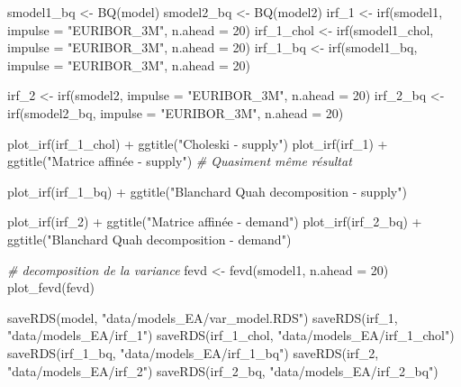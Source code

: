 \documentclass[
  10pt,
]{article}
\newenvironment{Shaded}{\begin{snugshade}}{\end{snugshade}}
\newcommand{\AttributeTok}[1]{\textcolor[rgb]{0.77,0.63,0.00}{#1}}
\newcommand{\CommentTok}[1]{\textcolor[rgb]{0.56,0.35,0.01}{\textit{#1}}}
\newcommand{\DecValTok}[1]{\textcolor[rgb]{0.00,0.00,0.81}{#1}}
\newcommand{\FunctionTok}[1]{\textcolor[rgb]{0.00,0.00,0.00}{#1}}
\newcommand{\NormalTok}[1]{#1}
\newcommand{\OtherTok}[1]{\textcolor[rgb]{0.56,0.35,0.01}{#1}}
\newcommand{\SpecialCharTok}[1]{\textcolor[rgb]{0.00,0.00,0.00}{#1}}
\newcommand{\StringTok}[1]{\textcolor[rgb]{0.31,0.60,0.02}{#1}}
\begin{document}
\begin{Shaded}
\begin{Highlighting}[]
\NormalTok{smodel1\_bq }\OtherTok{\textless{}{-}} \FunctionTok{BQ}\NormalTok{(model)}
\NormalTok{smodel2\_bq }\OtherTok{\textless{}{-}} \FunctionTok{BQ}\NormalTok{(model2)}
\NormalTok{irf\_1 }\OtherTok{\textless{}{-}} \FunctionTok{irf}\NormalTok{(smodel1, }\AttributeTok{impulse =} \StringTok{"EURIBOR\_3M"}\NormalTok{,}
           \AttributeTok{n.ahead =} \DecValTok{20}\NormalTok{)}
\NormalTok{irf\_1\_chol }\OtherTok{\textless{}{-}} \FunctionTok{irf}\NormalTok{(smodel1\_chol, }\AttributeTok{impulse =} \StringTok{"EURIBOR\_3M"}\NormalTok{,}
             \AttributeTok{n.ahead =} \DecValTok{20}\NormalTok{)}
\NormalTok{irf\_1\_bq }\OtherTok{\textless{}{-}} \FunctionTok{irf}\NormalTok{(smodel1\_bq, }\AttributeTok{impulse =} \StringTok{"EURIBOR\_3M"}\NormalTok{,}
                  \AttributeTok{n.ahead =} \DecValTok{20}\NormalTok{)}

\NormalTok{irf\_2 }\OtherTok{\textless{}{-}} \FunctionTok{irf}\NormalTok{(smodel2, }\AttributeTok{impulse =} \StringTok{"EURIBOR\_3M"}\NormalTok{,}
             \AttributeTok{n.ahead =} \DecValTok{20}\NormalTok{)}
\NormalTok{irf\_2\_bq }\OtherTok{\textless{}{-}} \FunctionTok{irf}\NormalTok{(smodel2\_bq, }\AttributeTok{impulse =} \StringTok{"EURIBOR\_3M"}\NormalTok{,}
                \AttributeTok{n.ahead =} \DecValTok{20}\NormalTok{)}

\FunctionTok{plot\_irf}\NormalTok{(irf\_1\_chol) }\SpecialCharTok{+} \FunctionTok{ggtitle}\NormalTok{(}\StringTok{"Choleski {-} supply"}\NormalTok{) }
\FunctionTok{plot\_irf}\NormalTok{(irf\_1) }\SpecialCharTok{+} \FunctionTok{ggtitle}\NormalTok{(}\StringTok{"Matrice affinée {-} supply"}\NormalTok{) }\CommentTok{\# Quasiment même résultat}

\FunctionTok{plot\_irf}\NormalTok{(irf\_1\_bq) }\SpecialCharTok{+} \FunctionTok{ggtitle}\NormalTok{(}\StringTok{"Blanchard Quah decomposition {-} supply"}\NormalTok{) }

\FunctionTok{plot\_irf}\NormalTok{(irf\_2) }\SpecialCharTok{+} \FunctionTok{ggtitle}\NormalTok{(}\StringTok{"Matrice affinée {-} demand"}\NormalTok{)}
\FunctionTok{plot\_irf}\NormalTok{(irf\_2\_bq) }\SpecialCharTok{+} \FunctionTok{ggtitle}\NormalTok{(}\StringTok{"Blanchard Quah decomposition {-} demand"}\NormalTok{)}

\CommentTok{\# decomposition de la variance}
\NormalTok{fevd }\OtherTok{\textless{}{-}} \FunctionTok{fevd}\NormalTok{(smodel1, }\AttributeTok{n.ahead =} \DecValTok{20}\NormalTok{)}
\FunctionTok{plot\_fevd}\NormalTok{(fevd)}


\FunctionTok{saveRDS}\NormalTok{(model, }\StringTok{"data/models\_EA/var\_model.RDS"}\NormalTok{)}
\FunctionTok{saveRDS}\NormalTok{(irf\_1, }\StringTok{"data/models\_EA/irf\_1"}\NormalTok{)}
\FunctionTok{saveRDS}\NormalTok{(irf\_1\_chol, }\StringTok{"data/models\_EA/irf\_1\_chol"}\NormalTok{)}
\FunctionTok{saveRDS}\NormalTok{(irf\_1\_bq, }\StringTok{"data/models\_EA/irf\_1\_bq"}\NormalTok{)}
\FunctionTok{saveRDS}\NormalTok{(irf\_2, }\StringTok{"data/models\_EA/irf\_2"}\NormalTok{)}
\FunctionTok{saveRDS}\NormalTok{(irf\_2\_bq, }\StringTok{"data/models\_EA/irf\_2\_bq"}\NormalTok{)}
\end{Highlighting}
\end{Shaded}
\end{document}
